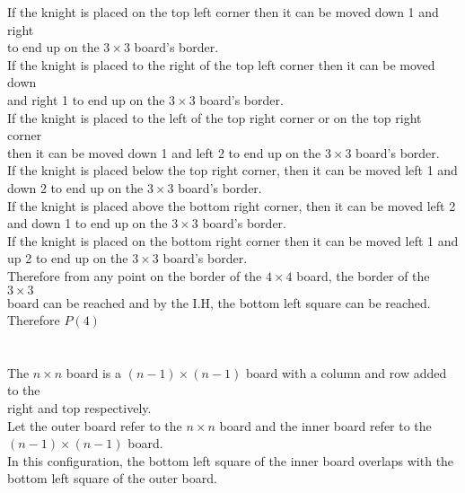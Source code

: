 \documentclass[11pt]{article}
\begin{document}
\begin{enumerate}
\begin{enumerate}
\begin{solution}
\null\qquad If the knight is placed on the top left corner then it can be moved down 1 and right\\
\null{} to end up on the $3\times3$ board's border.\\
\null\qquad If the knight is placed to the right of the top left corner then it can be moved down \\
\null{} and right 1 to end up on the $3\times3$ board's border.\\
\null\qquad If the knight is placed to the left of the top right corner or on the top right corner\\
\null\qquad  then it can be moved down 1 and left 2 to end up on the $3\times3$ board's border.\\
\null\qquad If the knight is placed below the top right corner, then it can be moved left 1 and \\
\null\qquad down 2 to end up on the $3\times3$ board's border.\\
\null\qquad If the knight is placed above the bottom right corner, then it can be moved left 2 \\
\null\qquad and down 1 to end up on the $3\times3$ board's border.\\
\null\qquad If the knight is placed on the bottom right corner then it can be moved left 1 and \\
\null\qquad up 2 to end up on the $3\times3$ board's border.\\
\null\qquad Therefore from any point on the border of the $4\times4$ board, the border of the $3\times3$\\
\null\qquad board can be reached and by the I.H, the bottom left square can be reached.\\
\null\quad Therefore $P(4)$\\\\
\null{}\\
\null\qquad The $n\times n$ board is a $(n-1)\times(n-1)$ board with a column and row added to the\\
\null\qquad right and top respectively.\\
\null\qquad Let the outer board refer to the $n\times n$ board and the inner board refer to the\\
\null\qquad $(n-1)\times (n-1)$ board.\\
\null\qquad In this configuration, the bottom left square of the inner board overlaps with the\\
\null\qquad bottom left square of the outer board.\\\\

\end{solution}
\end{enumerate}
\end{enumerate}
\end{document}
